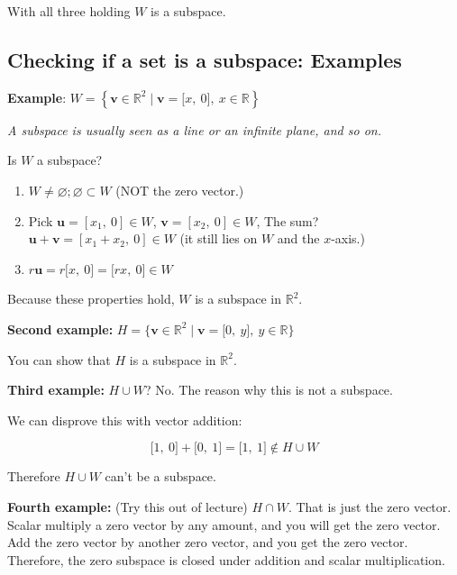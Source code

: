 \documentclass[12pt]{article}
\theoremstyle{plain}
\theoremstyle{remark}
\theoremstyle{definition}
\begin{document}
With all three holding \(W\) is a subspace.


\subsection{Checking if a set is a subspace:
Examples}

\textbf{Example}:
\(W = \left\{ \mathbf{v} \in \mathbb{R}^{2}\mid\mathbf{v} = \lbrack x,\ 0\rbrack,\ x\mathbb{\in R} \right\}\)

\emph{A subspace is usually seen as a line or an infinite plane, and so
on.}

Is \(W\) a subspace?

\begin{enumerate}
\def\labelenumi{\arabic{enumi}.}
\item
  \(W \neq \varnothing;\varnothing \subset W\) (NOT the zero vector.)
\item
  Pick \(\mathbf{u} = \left\lbrack x_{1},\ 0 \right\rbrack \in W\),
  \(\mathbf{v} = \left\lbrack x_{2},\ 0 \right\rbrack \in W\), The
  sum?
  \(\mathbf{u} + \mathbf{v} = \left\lbrack x_{1} + x_{2},\ 0 \right\rbrack \in W\)
  (it still lies on \(W\) and the \(x\)-axis.)
\item
  \(r\mathbf{u} = r\lbrack x,\ 0\rbrack = \lbrack rx,\ 0\rbrack \in W\)
\end{enumerate}

Because these properties hold, \(W\) is a subspace in
\(\mathbb{R}^{2}\).

\textbf{Second example:}
\(H = \{\mathbf{v} \in \mathbb{R}^{2} \mid \mathbf{v} = \lbrack 0,\ y\rbrack,\ y\mathbb{\in R\}}\)

You can show that \(H\) is a subspace in \(\mathbb{R}^{2}\).

\textbf{Third example:} \(H \cup W\)? No. The reason why this is not a
subspace.

We can disprove this with vector addition:

\[\lbrack 1,\ 0\rbrack + \lbrack 0,\ 1\rbrack = \lbrack 1,\ 1\rbrack \notin H \cup W\]

Therefore \(H \cup W\) can't be a subspace.


\textbf{Fourth example:} (Try this out of lecture) \(H \cap W\). That is
just the zero vector. Scalar multiply a zero vector by any amount, and
you will get the zero vector. Add the zero vector by another zero
vector, and you get the zero vector. Therefore, the zero subspace is
closed under addition and scalar multiplication.
\end{document}
